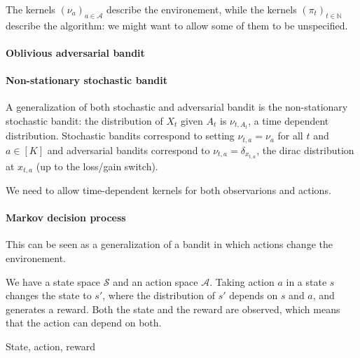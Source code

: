\begin{remark}
The kernels $(\nu_a)_{a \in \mathcal A}$ describe the environement, while the kernels $(\pi_t)_{t \in \mathbb{N}}$ describe the algorithm: we might want to allow some of them to be unspecified.
\end{remark}

\paragraph{Oblivious adversarial bandit}



\paragraph{Non-stationary stochastic bandit}

A generalization of both stochastic and adversarial bandit is the non-stationary stochastic bandit: the distribution of $X_t$ given $A_t$ is $\nu_{t, A_t}$, a time dependent distribution.
Stochastic bandits correspond to setting $\nu_{t, a} = \nu_a$ for all $t$ and $a \in [K]$ and adversarial bandits correspond to $\nu_{t, a} = \delta_{x_{t,a}}$, the dirac distribution at $x_{t,a}$ (up to the loss/gain switch).

\begin{remark}
We need to allow time-dependent kernels for both observarions and actions.
\end{remark}

\paragraph{Markov decision process}

This can be seen as a generalization of a bandit in which actions change the environement.

We have a state space $\mathcal S$ and an action space $\mathcal A$. Taking action $a$ in a state $s$ changes the state to $s'$, where the distribution of $s'$ depends on $s$ and $a$, and generates a reward. Both the state and the reward are observed, which means that the action can depend on both.

State, action, reward

